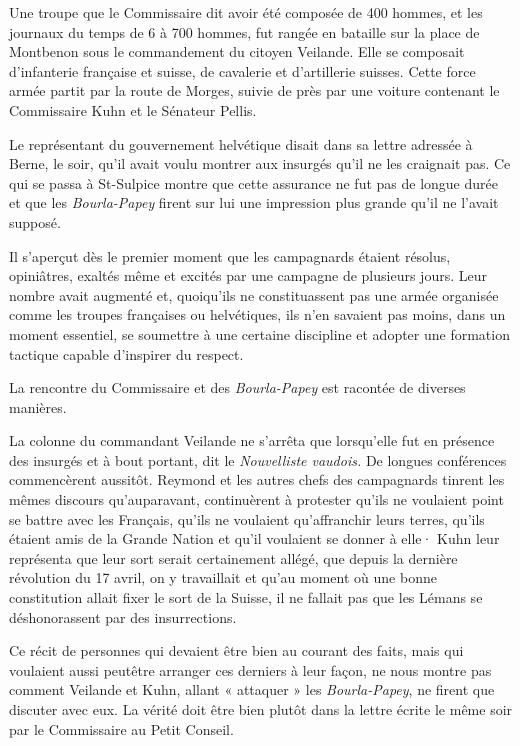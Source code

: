 \documentclass[french,twoside]{book} %
\begin{document}
\noindent Une troupe que le Commissaire dit avoir été composée de 400 hommes, et les journaux du temps de 6 à 700 hommes, fut rangée en bataille sur la place de Montbenon sous le commandement du citoyen Veilande. Elle se composait d’infanterie française et suisse, de cavalerie et d’artillerie suisses. Cette force armée partit par la route de Morges, suivie de près par une voiture contenant le Commissaire Kuhn et le Sénateur Pellis.\par
Le représentant du gouvernement helvétique disait dans sa lettre adressée à Berne, le soir, qu’il avait voulu montrer aux insurgés qu’il ne les craignait pas. Ce qui se passa à St-Sulpice montre que cette assurance ne fut pas de longue durée et que les \emph{Bourla-Papey} firent sur lui une impression plus grande qu’il ne l’avait supposé.\par
Il s’aperçut dès le premier moment que les campagnards étaient résolus, opiniâtres, exaltés même et excités par une campagne de plusieurs jours. Leur nombre avait augmenté et, quoiqu’ils ne constituassent pas une armée organisée comme les troupes françaises ou helvétiques, ils n’en savaient pas moins, dans un moment essentiel, se soumettre à une certaine discipline et adopter une formation tactique capable d’inspirer du respect.\par
La rencontre du Commissaire et des \emph{Bourla-Papey} est racontée de diverses manières.\par
La colonne du commandant Veilande ne s’arrêta que lorsqu’elle fut en présence des insurgés et à bout portant, dit le \emph{Nouvelliste vaudois.} De longues conférences commencèrent aussitôt. Reymond et les autres chefs des campagnards tinrent les mêmes discours qu’auparavant, continuèrent à protester qu’ils ne voulaient point se battre avec les Français, qu’ils ne voulaient qu’affranchir leurs terres, qu’ils étaient amis de la Grande Nation et qu’il voulaient se donner à elle· Kuhn leur représenta que leur sort serait certainement allégé, que depuis la dernière révolution du 17 avril, on y travaillait et qu’au moment où une bonne constitution allait fixer le sort de la Suisse, il ne fallait pas que les Lémans se déshonorassent par des insurrections.\par
Ce récit de personnes qui devaient être bien au courant des faits, mais qui voulaient aussi peutêtre arranger ces derniers à leur façon, ne nous montre pas comment Veilande et Kuhn, allant « attaquer » les \emph{Bourla-Papey}, ne firent que discuter avec eux. La vérité doit être bien plutôt dans la lettre écrite le même soir par le Commissaire au Petit Conseil.\par
\end{document}

